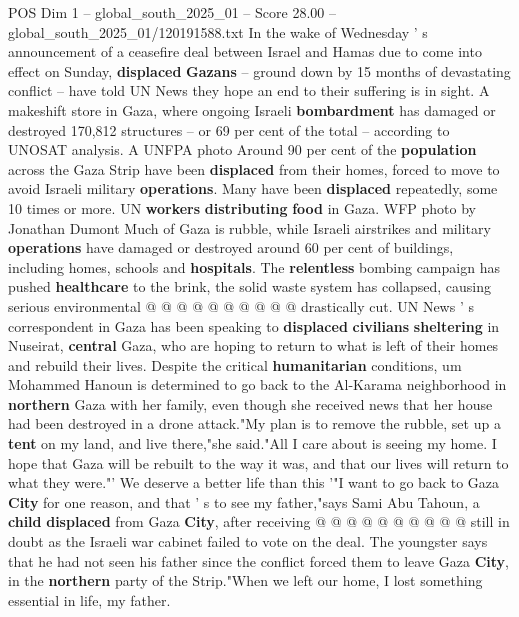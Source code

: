 \begin{textsample}{POS Dim 1 – global\_south\_2025\_01 – Score 28.00 – global\_south\_2025\_01/120191588.txt}  \label{ex:f1_pos_298}
In the wake of Wednesday ' s announcement of a ceasefire deal between Israel and Hamas due to come into effect on Sunday, \textbf{displaced} \textbf{Gazans} -- ground down by 15 months of devastating conflict -- have told UN News they hope an end to their suffering is in sight.
A makeshift store in Gaza, where ongoing Israeli \textbf{bombardment} has damaged or destroyed 170,812 structures -- or 69 per cent of the total -- according to UNOSAT analysis.
A UNFPA photo Around 90 per cent of the \textbf{population} across the Gaza Strip have been \textbf{displaced} from their homes, forced to move to avoid Israeli military \textbf{operations}.
Many have been \textbf{displaced} repeatedly, some 10 times or more.
UN \textbf{workers} \textbf{distributing} \textbf{food} in Gaza.
WFP photo by Jonathan Dumont Much of Gaza is rubble, while Israeli airstrikes and military \textbf{operations} have damaged or destroyed around 60 per cent of buildings, including homes, schools and \textbf{hospitals}.
The \textbf{relentless} bombing campaign has pushed \textbf{healthcare} to the brink, the solid waste system has collapsed, causing serious environmental @ @ @ @ @ @ @ @ @ @ drastically cut.
UN News ' s correspondent in Gaza has been speaking to \textbf{displaced} \textbf{civilians} \textbf{sheltering} in Nuseirat, \textbf{central} Gaza, who are hoping to return to what is left of their homes and rebuild their lives.
Despite the critical \textbf{humanitarian} conditions, um Mohammed Hanoun is determined to go back to the Al-Karama neighborhood in \textbf{northern} Gaza with her family, even though she received news that her house had been destroyed in a drone attack."My plan is to remove the rubble, set up a \textbf{tent} on my land, and live there,"she said."All I care about is seeing my home.
I hope that Gaza will be rebuilt to the way it was, and that our lives will return to what they were."' We deserve a better life than this '"I want to go back to Gaza \textbf{City} for one reason, and that ' s to see my father,"says Sami Abu Tahoun, a \textbf{child} \textbf{displaced} from Gaza \textbf{City}, after receiving @ @ @ @ @ @ @ @ @ @ still in doubt as the Israeli war cabinet failed to vote on the deal.
The youngster says that he had not seen his father since the conflict forced them to leave Gaza \textbf{City}, in the \textbf{northern} party of the Strip."When we left our home, I lost something essential in life, my father.

\end{textsample}

